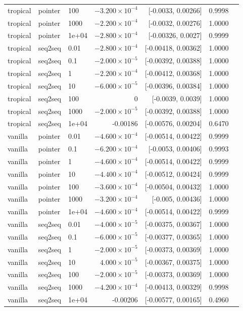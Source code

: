 \documentclass[10pt]{article}
\begin{document}
{\begin{longtable}{lllrrrl}
tropical & pointer & 100 & $-3.200\times10^{-4}$ & [-0.0033, 0.00266] & 0.9998 & \\
tropical & pointer & 1000 & $-2.200\times10^{-4}$ & [-0.0032, 0.00276] & 1.0000 & \\
tropical & pointer & 1e+04 & $-2.800\times10^{-4}$ & [-0.00326, 0.0027] & 0.9999 & \\
tropical & seq2seq & 0.01 & $-2.800\times10^{-4}$ & [-0.00418, 0.00362] & 1.0000 & \\
tropical & seq2seq & 0.1 & $-2.000\times10^{-5}$ & [-0.00392, 0.00388] & 1.0000 & \\
tropical & seq2seq & 1 & $-2.200\times10^{-4}$ & [-0.00412, 0.00368] & 1.0000 & \\
tropical & seq2seq & 10 & $-6.000\times10^{-5}$ & [-0.00396, 0.00384] & 1.0000 & \\
tropical & seq2seq & 100 & 0 & [-0.0039, 0.0039] & 1.0000 & \\
tropical & seq2seq & 1000 & $-2.000\times10^{-5}$ & [-0.00392, 0.00388] & 1.0000 & \\
tropical & seq2seq & 1e+04 & -0.00186 & [-0.00576, 0.00204] & 0.6470 & \\
vanilla & pointer & 0.01 & $-4.600\times10^{-4}$ & [-0.00514, 0.00422] & 0.9999 & \\
vanilla & pointer & 0.1 & $-6.200\times10^{-4}$ & [-0.0053, 0.00406] & 0.9993 & \\
vanilla & pointer & 1 & $-4.600\times10^{-4}$ & [-0.00514, 0.00422] & 0.9999 & \\
vanilla & pointer & 10 & $-4.400\times10^{-4}$ & [-0.00512, 0.00424] & 0.9999 & \\
vanilla & pointer & 100 & $-3.600\times10^{-4}$ & [-0.00504, 0.00432] & 1.0000 & \\
vanilla & pointer & 1000 & $-3.200\times10^{-4}$ & [-0.005, 0.00436] & 1.0000 & \\
vanilla & pointer & 1e+04 & $-4.600\times10^{-4}$ & [-0.00514, 0.00422] & 0.9999 & \\
vanilla & seq2seq & 0.01 & $-4.000\times10^{-5}$ & [-0.00375, 0.00367] & 1.0000 & \\
vanilla & seq2seq & 0.1 & $-6.000\times10^{-5}$ & [-0.00377, 0.00365] & 1.0000 & \\
vanilla & seq2seq & 1 & $-2.000\times10^{-5}$ & [-0.00373, 0.00369] & 1.0000 & \\
vanilla & seq2seq & 10 & $4.000\times10^{-5}$ & [-0.00367, 0.00375] & 1.0000 & \\
vanilla & seq2seq & 100 & $-2.000\times10^{-5}$ & [-0.00373, 0.00369] & 1.0000 & \\
vanilla & seq2seq & 1000 & $-4.200\times10^{-4}$ & [-0.00413, 0.00329] & 0.9998 & \\
vanilla & seq2seq & 1e+04 & -0.00206 & [-0.00577, 0.00165] & 0.4960 & \\
\bottomrule
\end{longtable}
}
\end{document}
